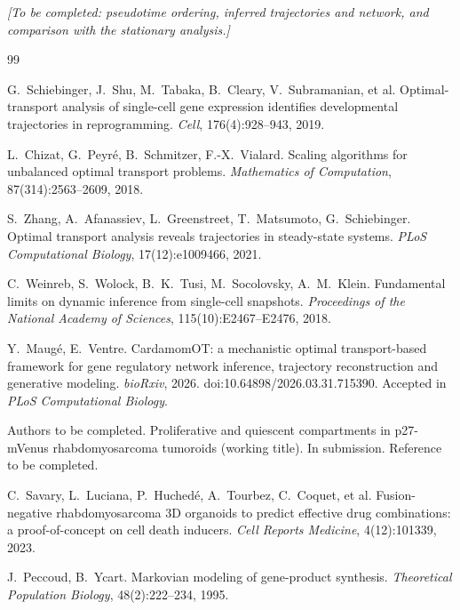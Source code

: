 \documentclass[a4paper, 11pt]{article}
\newcommand{\tofill}[1]{\par\smallskip\noindent\emph{[To be completed: #1]}\par\smallskip}
\theoremstyle{plain}
\theoremstyle{remark}
\begin{document}
\tofill{pseudotime ordering, inferred trajectories and network, and comparison with the stationary analysis.}

\fi

\begin{thebibliography}{99}

G.~Schiebinger, J.~Shu, M.~Tabaka, B.~Cleary, V.~Subramanian, et al.
\newblock Optimal-transport analysis of single-cell gene expression identifies developmental trajectories in reprogramming.
\newblock \emph{Cell}, 176(4):928--943, 2019.

L.~Chizat, G.~Peyré, B.~Schmitzer, F.-X.~Vialard.
\newblock Scaling algorithms for unbalanced optimal transport problems.
\newblock \emph{Mathematics of Computation}, 87(314):2563--2609, 2018.

S.~Zhang, A.~Afanassiev, L.~Greenstreet, T.~Matsumoto, G.~Schiebinger.
\newblock Optimal transport analysis reveals trajectories in steady-state systems.
\newblock \emph{PLoS Computational Biology}, 17(12):e1009466, 2021.

C.~Weinreb, S.~Wolock, B.~K.~Tusi, M.~Socolovsky, A.~M.~Klein.
\newblock Fundamental limits on dynamic inference from single-cell snapshots.
\newblock \emph{Proceedings of the National Academy of Sciences}, 115(10):E2467--E2476, 2018.

Y.~Maugé, E.~Ventre.
\newblock CardamomOT: a mechanistic optimal transport-based framework for gene regulatory network inference, trajectory reconstruction and generative modeling.
\newblock \emph{bioRxiv}, 2026. doi:10.64898/2026.03.31.715390. Accepted in \emph{PLoS Computational Biology}.

Authors to be completed.
\newblock Proliferative and quiescent compartments in p27-mVenus rhabdomyosarcoma tumoroids (working title).
\newblock In submission. Reference to be completed.

C.~Savary, L.~Luciana, P.~Huchedé, A.~Tourbez, C.~Coquet, et al.
\newblock Fusion-negative rhabdomyosarcoma 3D organoids to predict effective drug combinations: a proof-of-concept on cell death inducers.
\newblock \emph{Cell Reports Medicine}, 4(12):101339, 2023.

J.~Peccoud, B.~Ycart.
\newblock Markovian modeling of gene-product synthesis.
\newblock \emph{Theoretical Population Biology}, 48(2):222--234, 1995.


\end{thebibliography}
\end{document}

